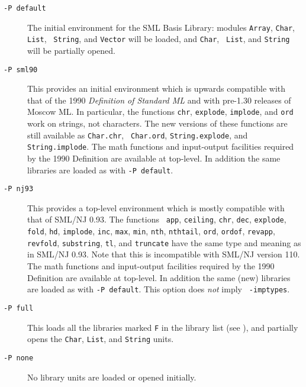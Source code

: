 \documentclass[fleqn,a4paper]{article}
\begin{document}
\begin{description}
  \begin{description}
  \item[{\tt -P default}] The initial environment for the SML Basis
    Library: modules {\tt Array}, {\tt Char}, {\tt List}, {\tt
      String}, and {\tt Vector} will be loaded, and {\tt Char}, {\tt
      List}, and {\tt String} will be partially opened.

  \item[{\tt -P sml90}] This provides an initial environment which is
    upwards compatible with that of the 1990 {\em Definition of
      Standard ML\/} and with pre-1.30 releases of Moscow ML\@.  In
    particular, the functions {\tt chr}, {\tt explode}, {\tt implode},
    and {\tt ord} work on strings, not characters.  The new versions
    of these functions are still available as {\tt Char.chr}, {\tt
      Char.ord}, {\tt String.explode}, and {\tt String.implode}.  The
    math functions and input-output facilities required by the 1990
    Definition \cite[Appendix C and D]{Milner:1990:TheDefinition} are
    available at top-level.  In addition the same libraries are
    loaded as with {\tt -P default}.

  \item[{\tt -P nj93}] This provides a top-level environment which is
    mostly compatible with that of SML/NJ 0.93.  The functions {\tt
      app}, {\tt ceiling}, {\tt chr}, {\tt dec}, {\tt explode}, {\tt
      fold}, {\tt hd}, {\tt implode}, {\tt inc}, {\tt max}, {\tt min},
    {\tt nth}, {\tt nthtail}, {\tt ord}, {\tt ordof}, {\tt revapp},
    {\tt revfold}, {\tt substring}, {\tt tl}, and {\tt truncate} have
    the same type and meaning as in SML/NJ 0.93.  Note that this is
    incompatible with SML/NJ version 110\@.  The math functions and
    input-output facilities required by the 1990 Definition
    \cite[Appendix C and D]{Milner:1990:TheDefinition} are available
    at top-level.  In addition the same (new) libraries are loaded as
    with {\tt -P default}.  This option does {\em not\/} imply {\tt
      -imptypes}.

  \item[{\tt -P full}] This loads all the libraries marked {\tt F} in
    the library list (see \cite{MoscowML:2000:MoscowMLLanguage}), and
  partially opens the {\tt Char}, {\tt List}, and {\tt String} units.

  \item[{\tt -P none}] No library units are loaded or opened initially.
  \end{description}
  

\end{description}
\end{document}
